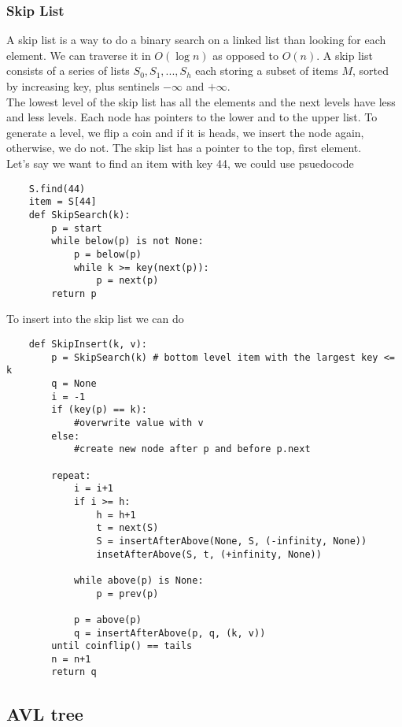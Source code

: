 \documentclass[]{article}
\begin{document}
\subsubsection{Skip List}\bigbreak

A skip list is a way to do a binary search on a linked list than looking for each element. We can traverse it in $O(\log n)$ as opposed to $O(n)$. A skip list consists of a series of lists ${S_0, S_1, ..., S_h}$ each storing a subset of items $M$, sorted by increasing key, plus sentinels $-\infty$ and $+\infty$.\\


The lowest level of the skip list has all the elements and the next levels have less and less levels. Each node has pointers to the lower and to the upper list. To generate a level, we flip a coin and if it is heads, we insert the node again, otherwise, we do not. The skip list has a pointer to the top, first element. \\

Let's say we want to find an item with key 44, we could use psuedocode

\begin{lstlisting}
	S.find(44)
	item = S[44]
	def SkipSearch(k):
		p = start
		while below(p) is not None:
			p = below(p)
			while k >= key(next(p)):
				p = next(p)
		return p
\end{lstlisting}\bigbreak


To insert into the skip list we can do

\begin{lstlisting}
	def SkipInsert(k, v):
		p = SkipSearch(k) # bottom level item with the largest key <= k
		q = None
		i = -1
		if (key(p) == k):
			#overwrite value with v
		else:
			#create new node after p and before p.next
			
		repeat:
			i = i+1
			if i >= h:
				h = h+1
				t = next(S)
				S = insertAfterAbove(None, S, (-infinity, None))
				insetAfterAbove(S, t, (+infinity, None))
				
			while above(p) is None:
				p = prev(p)
				
			p = above(p)
			q = insertAfterAbove(p, q, (k, v))
		until coinflip() == tails
		n = n+1
		return q
\end{lstlisting}\bigbreak




\subsection{AVL tree}\bigbreak
\end{document}
